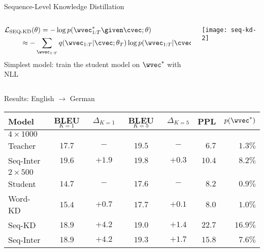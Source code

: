 \begin{frame}{Sequence-Level Knowledge Distillation}

\begin{columns}
\begin{column}{5cm}
\begin{align*}
\mathcal{L}_\text{SEQ-KD}(\theta) &= -\log p(\wvec^*_{1:T} \given \cvec ; \theta)  \\
& \hspace*{-1cm} \displaystyle \approx   -\sum_{\wvec_{1:T}} q(\wvec_{1:T} | \cvec; \theta_T) \log p(\wvec_{1:T} | \cvec ; \theta)
\end{align*}
Simplest model: train the student model on $\wvec^*$ with NLL
\end{column}
\begin{column}{7cm}
\texttt{[image: seq-kd-2]}
\end{column}
\end{columns}
\end{frame}

\begin{frame}{Results: English $\rightarrow$ German}
\air
\air
\begin{table}
\centering
\small
\begin{tabular}{lccccrr}
\toprule
Model &    BLEU$_{K=1}$   & $\Delta_{K=1}$ & BLEU$_{K=5}$ & $\Delta_{K=5}$ & PPL & $p(\wvec^*)$ \\
\midrule
$4 \times 1000$ \\
Teacher    & $17.7$ &  $-$ & $19.5$&   $-$ &   $6.7$ &  $1.3\%$ \\
\hspace{1mm} Seq-Inter    & $19.6$ & $+1.9$&  $19.8$& $+0.3$&   $10.4$ & $8.2\%$   \\
\midrule
$2 \times 500$ \\ 
Student  $\,$   & $14.7$ & $-$ & $17.6$&  $-$ &  $8.2$ & $0.9\%$  \\
\hspace{1mm} Word-KD  & $15.4$ & $+0.7$& $17.7$& $+0.1$&  $8.0$ & $1.0\%$  \\
\hspace{1mm} Seq-KD   & $18.9$ & $+\mathbf{4.2}$& $19.0$& $+1.4$&  $22.7$ & $16.9\%$ \\
\hspace{1mm} Seq-Inter  & $18.9$ & $+\mathbf{4.2}$&$19.3$ & $+\mathbf{1.7}$ &  $15.8$ & $7.6\%$  \\
\bottomrule
\end{tabular}

\end{table}
\air
\air
\end{frame}

